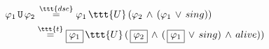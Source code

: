 \documentclass[11pt]{article}
\begin{document}
$\begin{aligned}
     \varphi_1\,\tt{U}\,\varphi_2 &\,\overset{\ttt{dsc}}{=} \varphi_1\,\ttt{U}\,(\varphi_2\,\land\,(\varphi_1\,\lor\,sing))\\
     &\overset{\ttt{t}}{=} \boxed{\varphi_1}\,\ttt{U}\,(\,\boxed{\varphi_2}\,\land\,(\,\boxed{\varphi_1}\,\lor\,sing)\,\land\,alive))
\end{aligned}$
\end{document}
